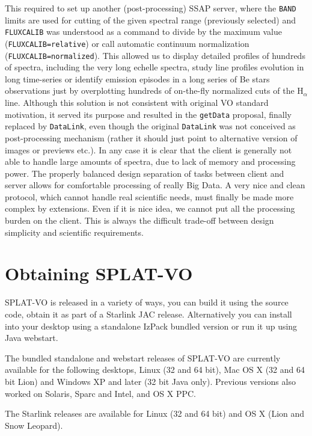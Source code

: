 \documentclass[final,authoryear,5p,times,twocolumn]{elsarticle}
\begin{document}
This required to set up another (post-processing) SSAP server, where
the \texttt{BAND} limits are used for cutting of the given spectral
range (previously selected) and \texttt{FLUXCALIB} was understood as a
command to divide by the maximum value (\texttt{FLUXCALIB=relative})
or call automatic continuum normalization
(\texttt{FLUXCALIB=normalized}).  This allowed us to display detailed
profiles of hundreds of spectra, including the very long echelle
spectra, study line profiles evolution in long time-series or identify
emission episodes in a long series of Be stars observations just by
overplotting hundreds of on-the-fly normalized cuts of the H$_\alpha$
line.  Although this solution is not consistent with original VO
standard motivation, it served its purpose and resulted in the
\texttt{getData} proposal, finally replaced by \texttt{DataLink}, even though
the original \texttt{DataLink} was not conceived as post-processing mechanism
(rather it should just point to alternative version of images or
previews etc.).  In any case it is clear that the client is generally
not able to handle large amounts of spectra, due to lack of memory and
processing power. The properly balanced design separation of tasks
between client and server allows for comfortable processing of really
Big Data.  A very nice and clean protocol, which cannot handle real
scientific needs, must finally be made more complex by
extensions. Even if it is nice idea, we cannot put all the processing
burden on the client.  This is always the difficult trade-off between
design simplicity and scientific requirements.


\section{Obtaining SPLAT-VO}

SPLAT-VO is released in a variety of ways, you can build it using the source
code, obtain it as part of a Starlink JAC release. Alternatively you can
install into your desktop using a standalone IzPack bundled version or run it
up using Java webstart.

The bundled standalone and webstart releases of SPLAT-VO are currently
available for the following desktops, Linux (32 and 64 bit), Mac OS X (32 and
64 bit Lion) and Windows XP and later (32 bit Java only). Previous versions
also worked on Solaris, Sparc and Intel, and OS X PPC.

The Starlink releases
\citep[e.g.,][]{currie_adassxxiii,2013ASPC..475..247B} are available
for Linux (32 and 64 bit) and OS X (Lion and Snow Leopard).
\end{document}
